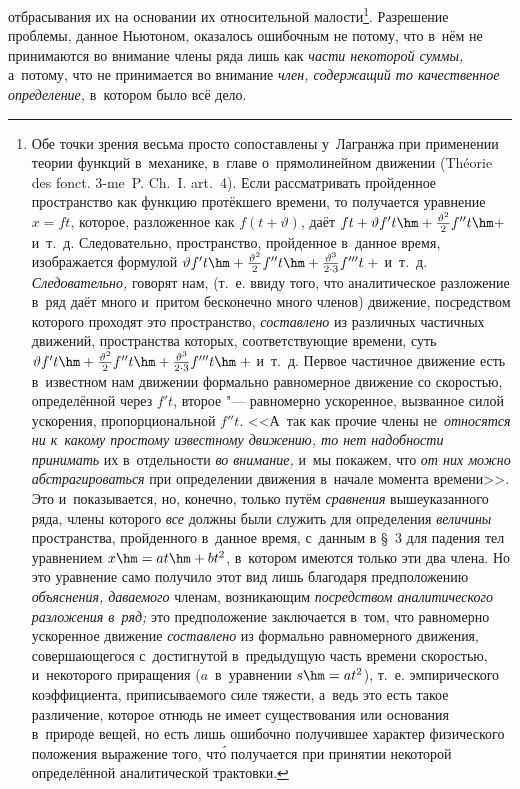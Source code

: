 отбрасывания их на основании их относительной малости\footnote{Обе точки зрения
весьма просто сопоставлены у~Лагранжа при применении теории функций в~механике,
в~главе о~прямолинейном движении (Théorie des fonct. 3-me~P. Ch.~I. art.~4).
Если рассматривать пройденное пространство как функцию протёкшего времени, то
получается уравнение $x=ft$, которое, разложенное как $f(t+\vartheta)$, даёт
$ft+\vartheta f't\hm+\frac{\vartheta^2}2f''t\hm+$ и~т.~д. Следовательно,
пространство, пройденное в~данное время, изображается формулой
$\vartheta f't\hm+\frac{\vartheta^2}2f''t\hm+
\frac{\vartheta^3}{2\cdot 3}f'''t\;+$ и~т.~д. {\em Следовательно,} говорят нам,
(т.~е. ввиду того, что аналитическое разложение в~ряд даёт много и~притом
бесконечно много членов) движение, посредством которого проходят это
пространство, {\em составлено} из различных частичных движений, пространства
которых, соответствующие времени, суть
$\vartheta f't\hm+\frac{\vartheta^2}2f''t\hm+
\frac{\vartheta^3}{2\cdot 3}f'''t\hm\;+$ и~т.~д. Первое частичное движение
есть в~известном нам движении формально равномерное движение со скоростью,
определённой через
$f't$, второе "--- равномерно ускоренное, вызванное силой ускорения,
пропорциональной $f''t$. <<А~так как прочие члены не~{\em относятся ни к~какому
простому известному движению, то нет надобности принимать} их в~отдельности
{\em во внимание,} и~мы покажем, что {\em от них можно абстрагироваться} при
определении движения в~начале момента времени>>. Это и~показывается, но,
конечно, только путём {\em сравнения} вышеуказанного ряда, члены которого
{\em все} должны были служить для определения {\em величины} пространства,
пройденного в~данное время, с~данным в \S~3 для падения тел уравнением
$x\hm=at\hm+bt^2$, в~котором имеются только эти два члена. Но это уравнение
само получило этот вид лишь благодаря предположению {\em объяснения, даваемого}
членам, возникающим {\em посредством аналитического разложения в~ряд;} это
предположение заключается в~том, что равномерно ускоренное движение
{\em составлено} из формально равномерного движения, совершающегося
с~достигнутой в~предыдущую часть времени скоростью, и~некоторого приращения
($a$~в~уравнении $s\hm=at^2$), т.~е. эмпирического коэффициента, приписываемого
силе тяжести, а~ведь это есть такое различение, которое отнюдь не имеет
существования или основания в~природе вещей, но есть лишь ошибочно получившее
характер физического положения выражение того, чт\'{о} получается при принятии
некоторой определённой аналитической трактовки.}. Разрешение проблемы, данное
Ньютоном, оказалось ошибочным не потому, что в~нём не принимаются во внимание
члены ряда лишь как {\em части некоторой суммы,} а~потому, что не принимается
во внимание {\em член, содержащий то качественное определение,} в~котором было
всё дело.

